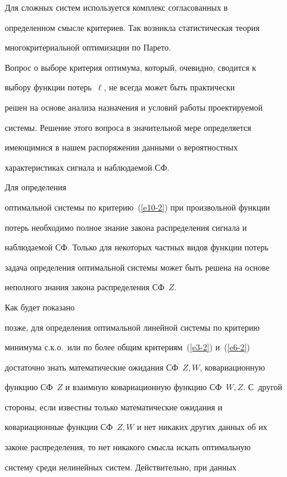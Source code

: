 Для сложных систем используется комплекс согласованных в


определенном смыс\-ле критериев. Так возникла статистическая теория


многокритериальной оптимизации по Парето.





Вопрос о выборе критерия оптимума, который, очевидно, сводится к


выбору функции потерь~$\ell$, не всегда может быть практически


решен на основе анализа назначения и условий работы проектируемой


системы. Решение этого вопроса в значительной мере определяется


имеющимися в нашем распоряжении данными о вероятностных


характеристиках сигнала и наблюдаемой СФ. 





Для определения


оптимальной системы по критерию~(\ref{e10-2}) при произвольной функции


потерь необходимо полное знание закона распределения сигнала и


наблюдаемой СФ. Только для некоторых частных видов функции потерь


задача определения оптимальной системы может быть решена на основе


неполного знания закона распределения СФ~$Z$. 





Как будет показано


позже, для определения оптимальной линейной сис\-те\-мы по критерию


минимума с.к.о.\ или по более общим критериям~(\ref{e3-2}) и~(\ref{e6-2})


достаточно знать математические ожидания СФ~$Z, W$, ковариационную


функцию СФ~$Z$ и взаимную ковариационную функцию СФ~$W,Z$. С~другой


стороны, если известны только математические ожидания и


ковариационные функции СФ~$Z,W$ и нет никаких других данных об их


законе распределения, то нет никакого смыс\-ла искать оптимальную


систему среди нелинейных систем. Действительно, при  данных



